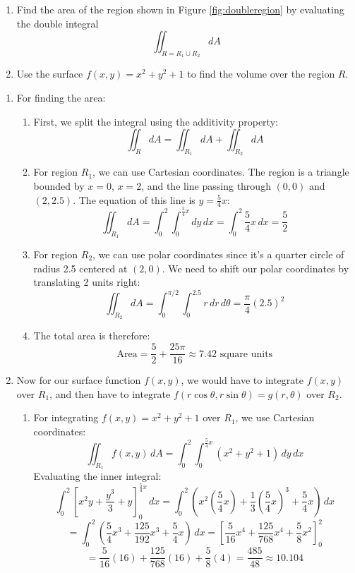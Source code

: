 \exampleline
\begin{example}
\begin{enumerate}
\item Find the area of the region shown in Figure \ref{fig:doubleregion} by evaluating the double integral
\[
\iint_{R = R_1 \cup R_2} dA
\]
\item Use the surface $f(x,y) = x^2 + y^2 + 1$ to find the volume over the region $R$.
\end{enumerate}

\begin{solution}
\begin{enumerate}
\item For finding the area:
\begin{enumerate}

\item First, we split the integral using the additivity property:
\[
\iint_R dA = \iint_{R_1} dA + \iint_{R_2} dA
\]

\item For region $R_1$, we can use Cartesian coordinates. The region is a triangle bounded by $x=0$, $x=2$, and the line passing through $(0,0)$ and $(2,2.5)$. The equation of this line is $y = \frac{5}{4}x$:
\[
\iint_{R_1} dA = \int_0^2 \int_0^{\frac{5}{4}x} dy\,dx = \int_0^2 \frac{5}{4}x\,dx = \frac{5}{2}
\]

\item For region $R_2$, we can use polar coordinates since it's a quarter circle of radius 2.5 centered at $(2,0)$. We need to shift our polar coordinates by translating 2 units right:
\[
\iint_{R_2} dA = \int_0^{\pi/2} \int_0^{2.5} r\,dr\,d\theta = \frac{\pi}{4}(2.5)^2
\]

\item The total area is therefore:
\[
\text{Area} = \frac{5}{2} + \frac{25\pi}{16} \approx 7.42 \text{ square units}
\]


\end{enumerate}

\item Now for our surface function $f(x,y)$, we would have to integrate $f(x,y)$ over $R_1$, and then have to integrate $f(r\cos\theta,r\sin\theta) = g(r,\theta)$ over $R_2$.
\begin{enumerate}
\item For integrating $f(x,y) = x^2 + y^2 + 1$ over $R_1$, we use Cartesian coordinates:
\[
\iint_{R_1} f(x,y)\,dA = \int_0^2 \int_0^{\frac{5}{4}x} (x^2 + y^2 + 1)\,dy\,dx
\]
Evaluating the inner integral:
\[
\int_0^2 \left[x^2y + \frac{y^3}{3} + y\right]_0^{\frac{5}{4}x}\,dx
= \int_0^2 \left(x^2(\frac{5}{4}x) + \frac{1}{3}(\frac{5}{4}x)^3 + \frac{5}{4}x\right)\,dx
\]
\[
= \int_0^2 \left(\frac{5}{4}x^3 + \frac{125}{192}x^3 + \frac{5}{4}x\right)\,dx
= \left[\frac{5}{16}x^4 + \frac{125}{768}x^4 + \frac{5}{8}x^2\right]_0^2
\]
\[
= \frac{5}{16}(16) + \frac{125}{768}(16) + \frac{5}{8}(4) = \frac{485}{48} \approx 10.104
\]


\end{enumerate}
\end{enumerate}
\end{solution}
\end{example}
